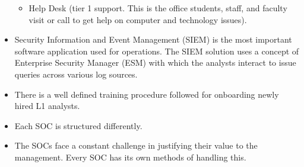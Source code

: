 \documentclass[14pt]{article}
\begin{document}
\begin{itemize}
\begin{itemize}
		\item Help Desk (tier 1 support. This is the oﬃce students, staﬀ, and faculty visit or call to get help on computer and technology issues).
		\end{itemize}
	\item Security Information and Event Management (SIEM) is the most important software application used for operations. The SIEM solution uses a concept of Enterprise Security Manager (ESM) with which the analysts interact to issue queries across various log sources.
	\item There is a well deﬁned training procedure followed for onboarding newly hired L1 analysts.
	\item Each SOC is structured diﬀerently.
	\item The SOCs face a constant challenge in justifying their value to the management. Every SOC has its own methods of handling this.
	\end{itemize}
\end{document}
